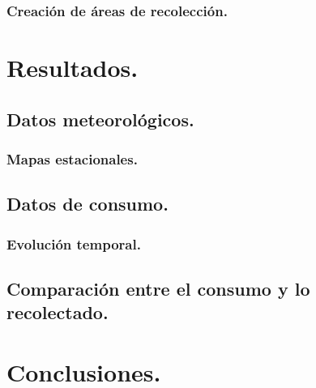\documentclass[letterpaper,12pt,oneside]{book}
\begin{document}
        \subsection{Creación de áreas de recolección.}
\chapter{Resultados.}
    \section{Datos meteorológicos.}
        \subsection{Mapas estacionales.}
    \section{Datos de consumo.}
        \subsection{Evolución temporal.}
    \section{Comparación entre el consumo y lo recolectado.}
\chapter{Conclusiones.}

\nocite{*}



\backmatter%
\end{document}
